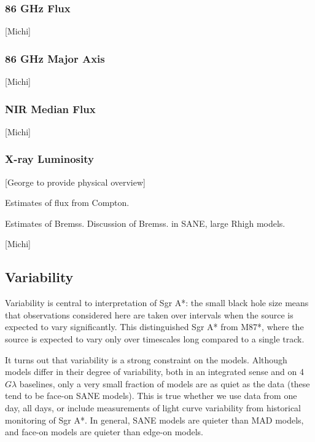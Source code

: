 \subsubsection{86 GHz Flux}

[Michi]

\subsubsection{86 GHz Major Axis}

[Michi]

\subsubsection{NIR Median Flux}

[Michi]

\subsubsection{X-ray Luminosity}

[George to provide physical overview]

Estimates of flux from Compton.

Estimates of Bremss.  Discussion of Bremss. in SANE, large Rhigh models.

[Michi]

\subsection{Variability}

Variability is central to interpretation of Sgr A*: the small black hole size means that observations considered here are taken over intervals when the source is expected to vary significantly.  This distinguished Sgr A* from M87*, where the source is expected to vary only over timescales long compared to a single track.  

It turns out that variability is a strong constraint on the models.  Although models differ in their degree of variability, both in an integrated sense and on 4 $G\lambda$ baselines, only a very small fraction of models are as quiet as the data (these tend to be face-on SANE models).  This is true whether we use data from one day, all days, or include measurements of light curve variability from historical monitoring of Sgr A*.   In general, SANE models are quieter than MAD models, and face-on models are quieter than edge-on models.

